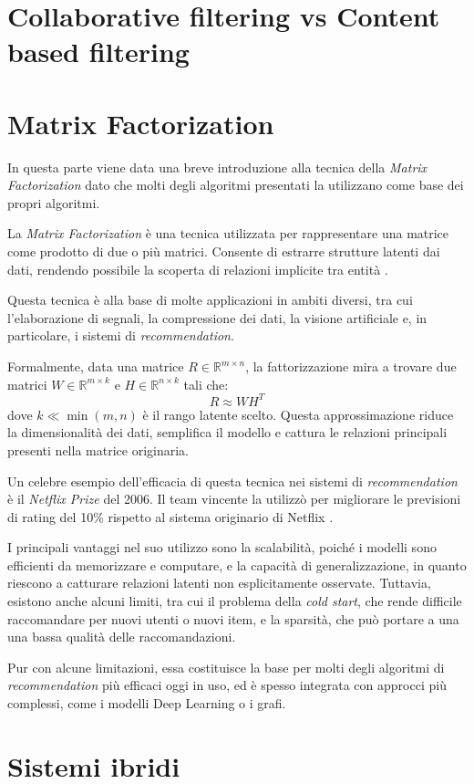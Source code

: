 \section{Collaborative filtering vs Content based filtering}

    

\section{Matrix Factorization}

In questa parte viene data una breve introduzione alla tecnica della \textit{Matrix Factorization} dato che molti degli algoritmi presentati la utilizzano come base dei propri algoritmi.

La \textit{Matrix Factorization} è una tecnica utilizzata per rappresentare una matrice come prodotto di due o più matrici. Consente di estrarre strutture latenti dai dati, rendendo possibile la scoperta di relazioni implicite tra entità \cite{MC}.

Questa tecnica è alla base di molte applicazioni in ambiti diversi, tra cui l'elaborazione di segnali, la compressione dei dati, la visione artificiale e, in particolare, i sistemi di \textit{recommendation}.

Formalmente, data una matrice $R \in \mathbb{R}^{m \times n}$, la fattorizzazione mira a trovare due matrici $W \in \mathbb{R}^{m \times k}$ e $H \in \mathbb{R}^{n \times k}$ tali che:
\[
R \approx WH^T
\]
dove $k \ll \min(m,n)$ è il rango latente scelto. Questa approssimazione riduce la dimensionalità dei dati, semplifica il modello e cattura le relazioni principali presenti nella matrice originaria.

Un celebre esempio dell'efficacia di questa tecnica nei sistemi di \textit{recommendation} è il \textit{Netflix Prize} del 2006. Il team vincente la utilizzò per migliorare le previsioni di rating del 10\% rispetto al sistema originario di Netflix \cite{TheNP}.

I principali vantaggi nel suo utilizzo sono la scalabilità, poiché i modelli sono efficienti da memorizzare e computare, e la capacità di generalizzazione, in quanto riescono a catturare relazioni latenti non esplicitamente osservate. Tuttavia, esistono anche alcuni limiti, tra cui il problema della \textit{cold start}, che rende difficile raccomandare per nuovi utenti o nuovi item, e la sparsità, che può portare a una una bassa qualità delle raccomandazioni\cite{SVD_analysis}.

Pur con alcune limitazioni, essa costituisce la base per molti degli algoritmi di \textit{recommendation} più efficaci oggi in uso, ed è spesso integrata con approcci più complessi, come i modelli Deep Learning o i grafi.


\section{Sistemi ibridi}
